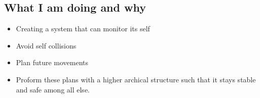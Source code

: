 \subsection{What I am doing and why}
\begin{itemize}
\item Creating a system that can monitor its self
\item Avoid self collisions
\item Plan future movements
\item Proform these plans with a higher archical structure such that it stays stable and safe among all else.
\end{itemize}
